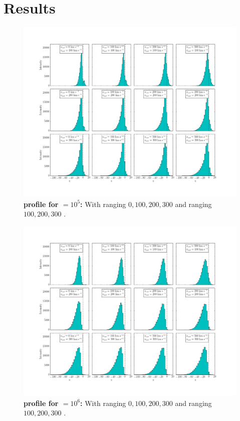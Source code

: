 \setcounter{equation}{0}
\chapter{Results}

\begin{figure}[h!]
	\begin{center}
		\includegraphics[width=1\textwidth]{./figures/tau10E5.png}
	\end{center}
	\caption{\textbf{\lya profile for \tauh$=10^5$:} With \vrot ranging $0,100,200,300$ \kms and \vout ranging $100,200,300$ \kms.
		\label{fig:tau10E5}}
\end{figure}

\begin{figure}[h!]
	\begin{center}
		\includegraphics[width=1\textwidth]{./figures/tau10E6.png}
	\end{center}
	\caption{\textbf{\lya profile for \tauh$=10^6$:} With \vrot ranging $0,100,200,300$ \kms and \vout ranging $100,200,300$ \kms.
		\label{fig:tau10E6}}
\end{figure}

